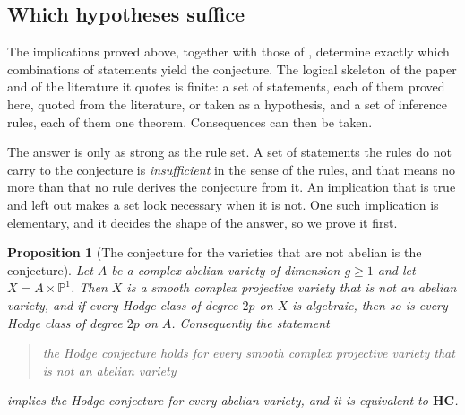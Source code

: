 \documentclass[11pt,reqno]{amsart}
\theoremstyle{plain}
\newtheorem{proposition}[theorem]{Proposition}
\theoremstyle{definition}
\theoremstyle{remark}
\newcommand{\PP}{\mathbb{P}}
\begin{document}
\subsection{Which hypotheses suffice}
\label{ssec:closure}

The implications proved above, together with those of ,
determine exactly which combinations of statements yield the conjecture. The
logical skeleton of the paper and of the literature it quotes is finite: a
set of statements, each of them proved here, quoted from the literature, or
taken as a hypothesis, and a set of inference rules, each of them one
theorem. Consequences can then be taken.

The answer is only as strong as the rule set. A set of statements the rules
do not carry to the conjecture is \emph{insufficient} in the sense of the
rules, and that means no more than that no rule derives the conjecture from
it. An implication that is true and left out makes a set look necessary when
it is not. One such implication
is elementary, and it decides the shape of the answer, so we prove it first.

\begin{proposition}[The conjecture for the varieties that are not abelian
is the conjecture]\label{prop:f3ishc}
Let $A$ be a complex abelian variety of dimension $g\ge1$ and let
$X=A\times\PP^{1}$. Then $X$ is a smooth complex projective variety that is
not an abelian variety, and if every Hodge class of degree $2p$ on $X$ is
algebraic, then so is every Hodge class of degree $2p$ on $A$. Consequently
the statement
\begin{quote}
the Hodge conjecture holds for every smooth complex projective variety that
is not an abelian variety
\end{quote}
implies the Hodge conjecture for every abelian variety, and it is equivalent
to $\mathbf{HC}$.
\end{proposition}
\end{document}

